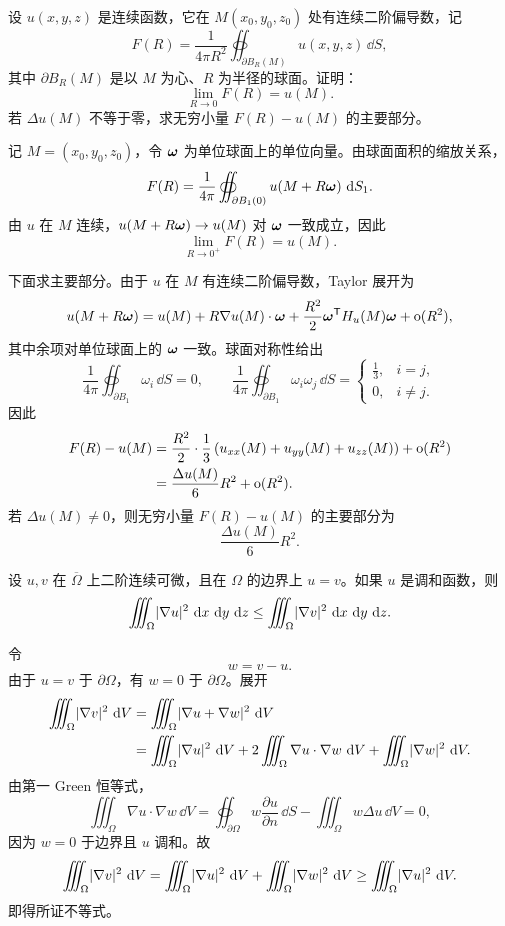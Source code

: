 \begin{xreferenceproblem}[5]
设 $u(x,y,z)$ 是连续函数，它在 $M(x_0,y_0,z_0)$ 处有连续二阶偏导数，记
\[
  F(R)=\frac{1}{4\pi R^2}\oiint_{\partial B_R(M)}u(x,y,z)\,\dd S,
\]
其中 $\partial B_R(M)$ 是以 $M$ 为心、$R$ 为半径的球面。证明：
\[
  \lim_{R\to0}F(R)=u(M).
\]
若 $\Delta u(M)$ 不等于零，求无穷小量 $F(R)-u(M)$ 的主要部分。
\end{xreferenceproblem}
\begin{xsolution}
记 $M=(x_0,y_0,z_0)$，令 $\bm{\omega}$ 为单位球面上的单位向量。由球面面积的缩放关系，
\[
  F(R)=\frac{1}{4\pi}\oiint_{\partial B_1(0)}u(M+R\bm{\omega})\,\mathop{}\!\mathrm{d} S_1.
\]
由 $u$ 在 $M$ 连续，$u(M+R\bm{\omega})\to u(M)$ 对 $\bm{\omega}$ 一致成立，因此
\[
  \lim_{R\to0^+}F(R)=u(M).
\]

下面求主要部分。由于 $u$ 在 $M$ 有连续二阶偏导数，Taylor 展开为
\[
  u(M+R\bm{\omega})
  =u(M)+R\nabla u(M)\cdot\bm{\omega}
  +\frac{R^2}{2}\bm{\omega}^{\mathsf T}H_u(M)\bm{\omega}
  +\mathrm{o}(R^2),
\]
其中余项对单位球面上的 $\bm{\omega}$ 一致。球面对称性给出
\[
  \frac1{4\pi}\oiint_{\partial B_1}\omega_i\,\dd S=0,
  \qquad
  \frac1{4\pi}\oiint_{\partial B_1}\omega_i\omega_j\,\dd S
  =\begin{cases}
  \frac13,&i=j,\\
  0,&i\ne j.
  \end{cases}
\]
因此
\begin{align*}
  F(R)-u(M)
  &=\frac{R^2}{2}\cdot\frac13
  \left(u_{xx}(M)+u_{yy}(M)+u_{zz}(M)\right)
  +\mathrm{o}(R^2)\\
  &=\frac{\Delta u(M)}{6}R^2+\mathrm{o}(R^2).
\end{align*}
若 $\Delta u(M)\ne0$，则无穷小量 $F(R)-u(M)$ 的主要部分为
\[
  \boxed{\frac{\Delta u(M)}6R^2}.
\]
\end{xsolution}


\begin{xreferenceproblem}[6]
设 $u,v$ 在 $\overline\Omega$ 上二阶连续可微，且在 $\Omega$ 的边界上 $u=v$。如果 $u$ 是调和函数，则
\[
  \iiint_\Omega\lvert\nabla u\rvert^2\,\mathop{}\!\mathrm{d} x\,\mathop{}\!\mathrm{d} y\,\mathop{}\!\mathrm{d} z
  \le\iiint_\Omega\lvert\nabla v\rvert^2\,\mathop{}\!\mathrm{d} x\,\mathop{}\!\mathrm{d} y\,\mathop{}\!\mathrm{d} z.
\]
\end{xreferenceproblem}
\begin{xsolution}
令
\[
  w=v-u.
\]
由于 $u=v$ 于 $\partial\Omega$，有 $w=0$ 于 $\partial\Omega$。展开
\begin{align*}
  \iiint_\Omega\lvert\nabla v\rvert^2\,\mathop{}\!\mathrm{d} V
  &=\iiint_\Omega\lvert\nabla u+\nabla w\rvert^2\,\mathop{}\!\mathrm{d} V\\
  &=\iiint_\Omega\lvert\nabla u\rvert^2\,\mathop{}\!\mathrm{d} V
    +2\iiint_\Omega\nabla u\cdot\nabla w\,\mathop{}\!\mathrm{d} V
    +\iiint_\Omega\lvert\nabla w\rvert^2\,\mathop{}\!\mathrm{d} V.
\end{align*}
由第一 Green 恒等式，
\[
  \iiint_\Omega\nabla u\cdot\nabla w\,\dd V
  =\oiint_{\partial\Omega}w\frac{\partial u}{\partial n}\,\dd S
  -\iiint_\Omega w\Delta u\,\dd V=0,
\]
因为 $w=0$ 于边界且 $u$ 调和。故
\[
  \iiint_\Omega\lvert\nabla v\rvert^2\,\mathop{}\!\mathrm{d} V
  =\iiint_\Omega\lvert\nabla u\rvert^2\,\mathop{}\!\mathrm{d} V
  +\iiint_\Omega\lvert\nabla w\rvert^2\,\mathop{}\!\mathrm{d} V
  \ge\iiint_\Omega\lvert\nabla u\rvert^2\,\mathop{}\!\mathrm{d} V.
\]
即得所证不等式。
\end{xsolution}


